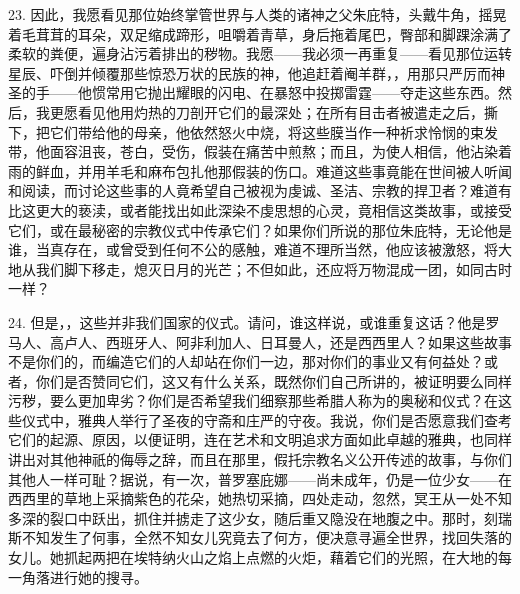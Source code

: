 23. 因此，我愿看见那位始终掌管世界与人类的诸神之父朱庇特，头戴牛角，摇晃着毛茸茸的耳朵，双足缩成蹄形，咀嚼着青草，身后拖着尾巴，臀部和脚踝涂满了柔软的粪便，遍身沾污着排出的秽物。我愿——我必须一再重复——看见那位运转星辰、吓倒并倾覆那些惊恐万状的民族的神，他追赶着阉羊群，，用那只严厉而神圣的手——他惯常用它抛出耀眼的闪电、在暴怒中投掷雷霆——夺走这些东西。然后，我更愿看见他用灼热的刀剖开它们的最深处；在所有目击者被遣走之后，撕下，把它们带给他的母亲，他依然怒火中烧，将这些膜当作一种祈求怜悯的束发带，他面容沮丧，苍白，受伤，假装在痛苦中煎熬；而且，为使人相信，他沾染着雨的鲜血，并用羊毛和麻布包扎他那假装的伤口。难道这些事竟能在世间被人听闻和阅读，而讨论这些事的人竟希望自己被视为虔诚、圣洁、宗教的捍卫者？难道有比这更大的亵渎，或者能找出如此深染不虔思想的心灵，竟相信这类故事，或接受它们，或在最秘密的宗教仪式中传承它们？如果你们所说的那位朱庇特，无论他是谁，当真存在，或曾受到任何不公的感触，难道不理所当然，他应该被激怒，将大地从我们脚下移走，熄灭日月的光芒；不但如此，还应将万物混成一团，如同古时一样？\par

24. 但是，，这些并非我们国家的仪式。请问，谁这样说，或谁重复这话？他是罗马人、高卢人、西班牙人、阿非利加人、日耳曼人，还是西西里人？如果这些故事不是你们的，而编造它们的人却站在你们一边，那对你们的事业又有何益处？或者，你们是否赞同它们，这又有什么关系，既然你们自己所讲的，被证明要么同样污秽，要么更加卑劣？你们是否希望我们细察那些希腊人称为的奥秘和仪式？在这些仪式中，雅典人举行了圣夜的守斋和庄严的守夜。我说，你们是否愿意我们查考它们的起源、原因，以便证明，连在艺术和文明追求方面如此卓越的雅典，也同样讲出对其他神祇的侮辱之辞，而且在那里，假托宗教名义公开传述的故事，与你们其他人一样可耻？据说，有一次，普罗塞庇娜——尚未成年，仍是一位少女——在西西里的草地上采摘紫色的花朵，她热切采摘，四处走动，忽然，冥王从一处不知多深的裂口中跃出，抓住并掳走了这少女，随后重又隐没在地腹之中。那时，刻瑞斯不知发生了何事，全然不知女儿究竟去了何方，便决意寻遍全世界，找回失落的女儿。她抓起两把在埃特纳火山之焰上点燃的火炬，藉着它们的光照，在大地的每一角落进行她的搜寻。\par

